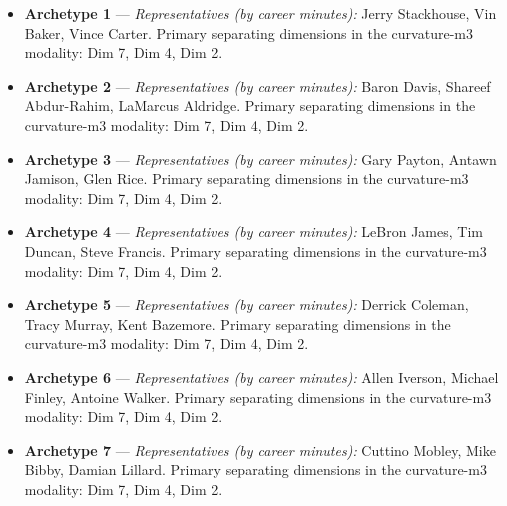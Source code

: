\begin{itemize}
\item \textbf{Archetype 1} --- \emph{Representatives (by career minutes):} Jerry Stackhouse, Vin Baker, Vince Carter. Primary separating dimensions in the curvature-m3 modality: Dim 7, Dim 4, Dim 2.
\item \textbf{Archetype 2} --- \emph{Representatives (by career minutes):} Baron Davis, Shareef Abdur-Rahim, LaMarcus Aldridge. Primary separating dimensions in the curvature-m3 modality: Dim 7, Dim 4, Dim 2.
\item \textbf{Archetype 3} --- \emph{Representatives (by career minutes):} Gary Payton, Antawn Jamison, Glen Rice. Primary separating dimensions in the curvature-m3 modality: Dim 7, Dim 4, Dim 2.
\item \textbf{Archetype 4} --- \emph{Representatives (by career minutes):} LeBron James, Tim Duncan, Steve Francis. Primary separating dimensions in the curvature-m3 modality: Dim 7, Dim 4, Dim 2.
\item \textbf{Archetype 5} --- \emph{Representatives (by career minutes):} Derrick Coleman, Tracy Murray, Kent Bazemore. Primary separating dimensions in the curvature-m3 modality: Dim 7, Dim 4, Dim 2.
\item \textbf{Archetype 6} --- \emph{Representatives (by career minutes):} Allen Iverson, Michael Finley, Antoine Walker. Primary separating dimensions in the curvature-m3 modality: Dim 7, Dim 4, Dim 2.
\item \textbf{Archetype 7} --- \emph{Representatives (by career minutes):} Cuttino Mobley, Mike Bibby, Damian Lillard. Primary separating dimensions in the curvature-m3 modality: Dim 7, Dim 4, Dim 2.
\end{itemize}

